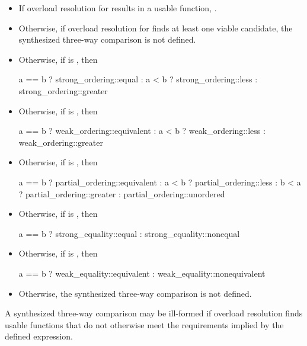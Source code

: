 \begin{itemize}
\item
If overload resolution for 
results in a usable function,
.

\item
Otherwise, if overload resolution for 
finds at least one viable candidate,
the synthesized three-way comparison is not defined.

\item
Otherwise, if  is , then
\begin{codeblock}
a == b ? strong_ordering::equal :
a < b  ? strong_ordering::less :
         strong_ordering::greater
\end{codeblock}

\item
Otherwise, if  is , then
\begin{codeblock}
a == b ? weak_ordering::equivalent :
a < b  ? weak_ordering::less :
         weak_ordering::greater
\end{codeblock}

\item
Otherwise, if  is , then
\begin{codeblock}
a == b ? partial_ordering::equivalent :
a < b  ? partial_ordering::less :
b < a  ? partial_ordering::greater :
         partial_ordering::unordered
\end{codeblock}

\item
Otherwise, if  is , then
\begin{codeblock}
a == b ? strong_equality::equal : strong_equality::nonequal
\end{codeblock}

\item
Otherwise, if  is , then
\begin{codeblock}
a == b ? weak_equality::equivalent : weak_equality::nonequivalent
\end{codeblock}

\item
Otherwise, the synthesized three-way comparison is not defined.
\end{itemize}
\begin{note}
A synthesized three-way comparison may be ill-formed
if overload resolution finds usable functions
that do not otherwise meet the requirements implied by the defined expression.
\end{note}

